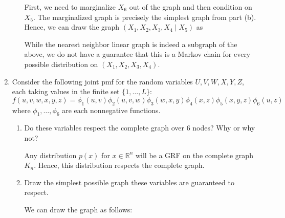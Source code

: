 \documentclass[11pt]{report}
\newcommand{\R}{\mathbb{R}}
\begin{document}
\begin{enumerate}[1.]
\begin{enumerate}
		            \color{blue}
		            First, we need to marginalize $X_6$ out of the graph and then condition on $X_5$. The marginalized graph is precisely the simplest graph from part (b). Hence, we can draw the graph $(X_1, X_2, X_3, X_4 \; | \; X_5)$ as

		            \begin{center}

		            \end{center}

		            While the nearest neighbor linear graph is indeed a subgraph of the above, we do not have a guarantee that this is a Markov chain for every possible distribution on $(X_1, X_2, X_3, X_4)$.
		            \color{black}

	      \end{enumerate}



	      \pagebreak


	\item Consider the following joint pmf for the random variables $U,V,W,X,Y,Z$, each taking values in the finite set $\{1,\dotsc,L\}$:
	      \[ f(u,v,w,x,y,z) = \phi_1(u,v)\phi_2(u,v,w)\phi_3(w,x,y)\phi_4(x,z)\phi_5(x,y,z)\phi_6(u,z) \]
	      where $\phi_1,\dotsc,\phi_6$ are each nonnegative functions.
	      \begin{enumerate}
		      \item Do these variables respect the complete graph over 6 nodes?  Why or why not?

		            \color{blue}

		            Any distribution $p(x)$ for $x \in \R^n$ will be a GRF on the complete graph $K_n$. Hence, this distribution respects the complete graph.

		            \color{black}

		      \item Draw the simplest possible graph these variables are guaranteed to respect.

		            \color{blue}
		            We can draw the graph as follows:


\end{enumerate}
\end{enumerate}
\end{document}
